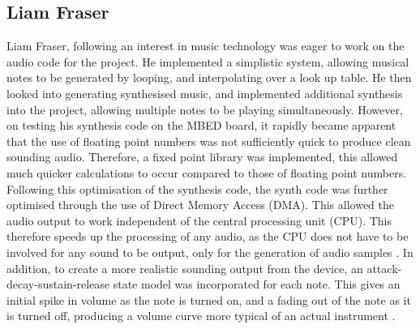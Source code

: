 \subsection*{Liam Fraser}
Liam Fraser, following an interest in music technology was eager to work on the 
audio code for the project. He implemented a simplistic system, allowing musical 
notes to be generated by looping, and interpolating over a look up table. He then 
looked into generating synthesised music, and implemented additional synthesis 
into the project, allowing multiple notes to be playing simultaneously. However, 
on testing his synthesis code on the MBED board, it rapidly became apparent that 
the use of floating point numbers was not sufficiently quick to produce clean 
sounding audio. Therefore, a fixed point library was implemented, this allowed 
much quicker calculations to occur compared to those of floating point numbers. 
Following this optimisation of the synthesis code, the synth code was further 
optimised through the use of Direct Memory Access (DMA). This allowed the audio 
output to work independent of the central processing unit (CPU). This 
therefore speeds up the processing of any audio, as the CPU does not have to be 
involved for any sound to be output, only for the generation of audio samples 
\cite{dma-book}. In addition, to create a more realistic sounding output from the 
device, an attack-decay-sustain-release state model was incorporated for each note. 
This gives an initial spike in volume as the note is turned on, and a fading out 
of the note as it is turned off, producing a volume curve more typical of an 
actual instrument \cite{asr-book}.

